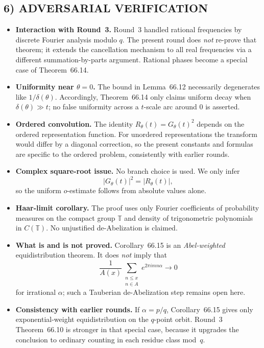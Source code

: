 \subsection*{6) ADVERSARIAL VERIFICATION}
\begin{itemize}
\item \textbf{Interaction with Round~3.}  Round~3 handled rational frequencies by discrete Fourier analysis modulo $q$.  The present round does \emph{not} re-prove that theorem; it extends the cancellation mechanism to all real frequencies via a different summation-by-parts argument.  Rational phases become a special case of Theorem~66.14.
\item \textbf{Uniformity near $\theta=0$.}  The bound in Lemma~66.12 necessarily degenerates like $1/\delta(\theta)$.  Accordingly, Theorem~66.14 only claims uniform decay when $\delta(\theta)\gg t$; no false uniformity across a $t$-scale arc around $0$ is asserted.
\item \textbf{Ordered convolution.}  The identity $R_\theta(t)=G_\theta(t)^2$ depends on the ordered representation function.  For unordered representations the transform would differ by a diagonal correction, so the present constants and formulas are specific to the ordered problem, consistently with earlier rounds.
\item \textbf{Complex square-root issue.}  No branch choice is used.  We only infer
\[
|G_\theta(t)|^2=|R_\theta(t)|,
\]
so the uniform $o$-estimate follows from absolute values alone.
\item \textbf{Haar-limit corollary.}  The proof uses only Fourier coefficients of probability measures on the compact group $\mathbb T$ and density of trigonometric polynomials in $C(\mathbb T)$.  No unjustified de-Abelization is claimed.
\item \textbf{What is and is not proved.}  Corollary~66.15 is an \emph{Abel-weighted} equidistribution theorem.  It does \emph{not} imply that
\[
\frac{1}{A(x)}\sum_{\substack{n\le x\\ n\in A}} e^{2\pi i mn\alpha}\to0
\]
for irrational $\alpha$; such a Tauberian de-Abelization step remains open here.
\item \textbf{Consistency with earlier rounds.}  If $\alpha=p/q$, Corollary~66.15 gives only exponential-weight equidistribution on the $q$-point orbit.  Round~3 Theorem~66.10 is stronger in that special case, because it upgrades the conclusion to ordinary counting in each residue class mod~$q$.
\end{itemize}

